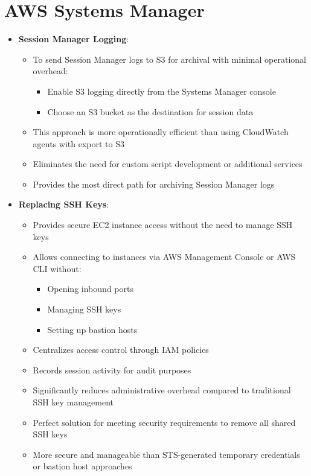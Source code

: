 \documentclass[11pt,a4paper]{report}
\begin{document}
\section{AWS Systems Manager}

\begin{itemize}
  \item \textbf{Session Manager Logging}:
\begin{itemize}
  \item To send Session Manager logs to S3 for archival with minimal operational overhead:
\begin{itemize}
  \item Enable S3 logging directly from the Systems Manager console
  \item Choose an S3 bucket as the destination for session data
\end{itemize}
  \item This approach is more operationally efficient than using CloudWatch agents with export to S3
  \item Eliminates the need for custom script development or additional services
  \item Provides the most direct path for archiving Session Manager logs
\end{itemize}
  \item \textbf{Replacing SSH Keys}:
\begin{itemize}
  \item Provides secure EC2 instance access without the need to manage SSH keys
  \item Allows connecting to instances via AWS Management Console or AWS CLI without:
\begin{itemize}
  \item Opening inbound ports
  \item Managing SSH keys
  \item Setting up bastion hosts
\end{itemize}
  \item Centralizes access control through IAM policies
  \item Records session activity for audit purposes
  \item Significantly reduces administrative overhead compared to traditional SSH key management
  \item Perfect solution for meeting security requirements to remove all shared SSH keys
  \item More secure and manageable than STS-generated temporary credentials or bastion host approaches
\end{itemize}
\end{itemize}
\end{document}
